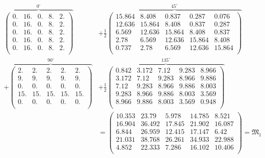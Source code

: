 \documentclass[slug=PET, room=Andreas-Schubert-Bau\,\ 424A, supervisor=Carsten\ Bittrich, coursedate=10.\ 01.\ 2020]{../../Lab_Report_LaTeX/lab_report}
\begin{document}
{\footnotesize
\setlength{\arraycolsep}{2.5pt}

\begin{align}
  \label{eq:simplerepr}
  \overbrace{\begin{pmatrix}
      0. & 16. & 0. & 8. & 2.\\
      0. & 16. & 0. & 8. & 2.\\
      0. & 16. & 0. & 8. & 2.\\
      0. & 16. & 0. & 8. & 2.\\
      0. & 16. & 0. & 8. & 2.\\
    \end{pmatrix}}^{0^\circ} & + \frac{1}{2}\overbrace{\begin{pmatrix}
      15.864 & 8.408 & 0.837 & 0.287 & 0.076\\
      12.636 & 15.864 & 8.408 & 0.837 & 0.287\\
      6.569 & 12.636 & 15.864 & 8.408 & 0.837\\
      2.78 & 6.569 & 12.636 & 15.864 & 8.408\\
      0.737 & 2.78 & 6.569 & 12.636 & 15.864\\
    \end{pmatrix}}^{45^\circ} \nonumber \\ + \overbrace{\begin{pmatrix}
      2. & 2. & 2. & 2. & 2.\\
      9. & 9. & 9. & 9. & 9.\\
      0. & 0. & 0. & 0. & 0.\\
      15. & 15. & 15. & 15. & 15.\\
      0. & 0. & 0. & 0. & 0.\\
    \end{pmatrix}}^{90^\circ} &+ \frac{1}{2}\overbrace{\begin{pmatrix}
      0.842 & 3.172 & 7.12 & 9.283 & 8.966\\
      3.172 & 7.12 & 9.283 & 8.966 & 9.886\\
      7.12 & 9.283 & 8.966 & 9.886 & 8.003\\
      9.283 & 8.966 & 9.886 & 8.003 & 3.569\\
      8.966 & 9.886 & 8.003 & 3.569 & 0.948\\
    \end{pmatrix}}^{135^\circ}\nonumber \\
  & = \begin{pmatrix}
    10.353 & 23.79 & 5.978 & 14.785 & 8.521\\
    16.904 & 36.492 & 17.845 & 21.902 & 16.087\\
    6.844 & 26.959 & 12.415 & 17.147 & 6.42\\
    21.031 & 38.768 & 26.261 & 34.933 & 22.988\\
    4.852 & 22.333 & 7.286 & 16.102 & 10.406\\
  \end{pmatrix} = \mathfrak{M}_1
\end{align}}
\end{document}
